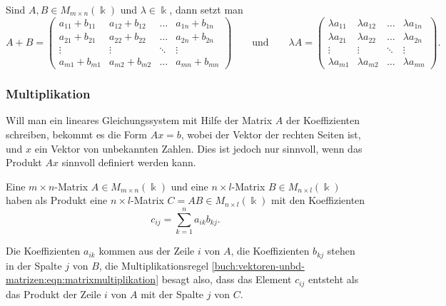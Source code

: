 \begin{definition}
Sind $A,B\in M_{m\times n}(\Bbbk)$ und $\lambda\in\Bbbk$, dann setzt man
\[
A+B
=
\begin{pmatrix}
a_{11}+b_{11}&a_{12}+b_{12}&\dots &a_{1n}+b_{1n}\\
a_{21}+b_{21}&a_{22}+b_{22}&\dots &a_{2n}+b_{2n}\\
\vdots       &\vdots       &\ddots&\vdots       \\
a_{m1}+b_{m1}&a_{m2}+b_{m2}&\dots &a_{mn}+b_{mn}
\end{pmatrix}
\qquad\text{und}\qquad
\lambda A
=
\begin{pmatrix}
\lambda a_{11}&\lambda a_{12}&\dots &\lambda a_{1n}\\
\lambda a_{21}&\lambda a_{22}&\dots &\lambda a_{2n}\\
\vdots        &\vdots        &\ddots&\vdots        \\
\lambda a_{m1}&\lambda a_{m2}&\dots &\lambda a_{mn}
\end{pmatrix}.
\]
\end{definition}

\subsubsection{Multiplikation}
Will man ein lineares Gleichungssystem mit Hilfe der Matrix $A$ der
Koeffizienten schreiben, bekommt es die Form $Ax=b$, wobei der Vektor
der rechten Seiten ist, und $x$ ein Vektor von unbekannten Zahlen.
Dies ist jedoch nur sinnvoll, wenn das Produkt $Ax$ sinnvoll definiert
werden kann.

\begin{definition}
Eine $m\times n$-Matrix $A\in M_{m\times n}(\Bbbk)$ und eine
$n\times l$-Matrix $B\in M_{n\times l}(\Bbbk)$ haben als Produkt
eine $n\times l$-Matrix $C=AB\in M_{n\times l}(\Bbbk)$ mit den
Koeffizienten
\begin{equation}
c_{ij} = \sum_{k=1}^n a_{ik} b_{kj}.
\label{buch:vektoren-unbd-matrizen:eqn:matrixmultiplikation}
\end{equation}
\end{definition}

Die Koeffizienten $a_{ik}$ kommen aus der Zeile $i$ von $A$, die Koeffizienten
$b_{kj}$ stehen in der Spalte $j$ von $B$, die Multiplikationsregel
\eqref{buch:vektoren-unbd-matrizen:eqn:matrixmultiplikation}
besagt also, dass das Element $c_{ij}$ entsteht als das Produkt
der Zeile $i$ von $A$ mit der Spalte $j$ von $C$.

